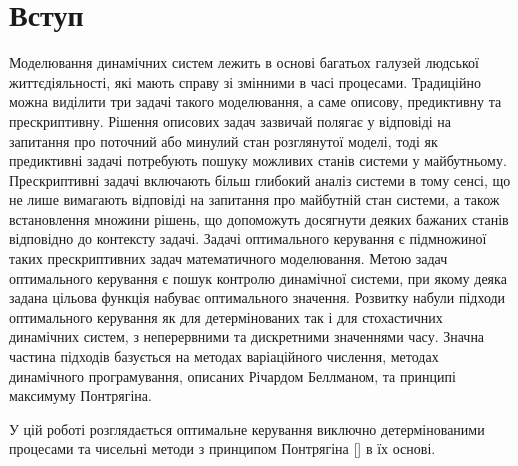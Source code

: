 \documentclass[a4paper,12pt]{extreport}
\begin{document}
\chapter{Вступ} 
Моделювання динамічних систем лежить в основі багатьох галузей людської життєдіяльності, 
які мають справу зі змінними в часі процесами. Традиційно можна виділити три задачі такого моделювання, а 
саме описову, предиктивну та прескриптивну. Рішення описових задач зазвичай полягає у відповіді на запитання 
про поточний або минулий стан розглянутої моделі, тоді як предиктивні задачі потребують пошуку можливих станів 
системи у майбутньому. Прескриптивні задачі включають більш глибокий аналіз системи в тому сенсі, що не лише вимагають
відповіді на запитання про майбутній стан системи, а також встановлення множини рішень, що допоможуть досягнути 
деяких бажаних станів відповідно до контексту задачі. Задачі оптимального керування є підмножиної 
таких прескриптивних задач математичного моделювання. Метою задач оптимального керування є пошук контролю 
динамічної системи, при якому деяка задана цільова функція набуває оптимального значення.
Розвитку набули підходи оптимального керування як для детермінованих так і для стохастичних динамічних систем, з неперервними 
та дискретними значеннями часу. 
Значна частина підходів базується на методах варіаційного числення, методах динамічного програмування, описаних Річардом Беллманом, та 
принципі максимуму Понтрягіна.

У цій роботі розглядається оптимальне керування виключно детермінованими процесами та чисельні методи з принципом Понтрягіна [] в їх основі.
\end{document}
